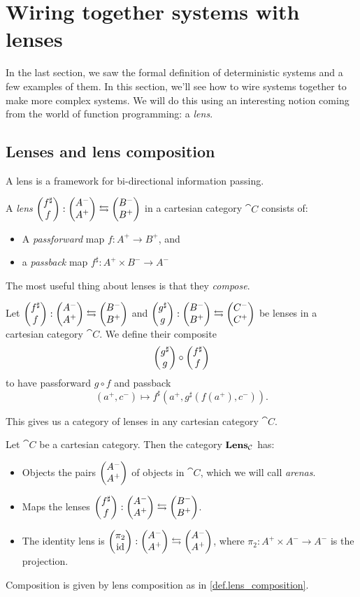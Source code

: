 \documentclass[DynamicalBook]{subfiles}
\begin{document}
\section{Wiring together systems with lenses}

In the last section, we saw the formal definition of deterministic systems and a
few examples of them. In this section, we'll see how to wire systems together to
make more complex systems. We will do this using an interesting notion coming
from the world of function programming: a \emph{lens}.

\subsection{Lenses and lens composition}\label{sec.lens_discrete}

A lens is a framework for bi-directional information passing.

\begin{definition}\label{def.lens}
  A \emph{lens} $\begin{pmatrix}{f^{\sharp}} \\ {f} \end{pmatrix} : \begin{pmatrix}{A^-} \\ {A^+} \end{pmatrix} \leftrightarrows
  \begin{pmatrix}{B^-} \\ {B^+} \end{pmatrix}$ in a cartesian category $\cat{C}$ consists of:
  \begin{itemize}
  \item A \emph{passforward} map $f : A^+ \to B^+$, and
    \item a \emph{passback} map $f^{\sharp} : A^+ \times B^- \to A^-$
  \end{itemize}
\end{definition}

The most useful thing about lenses is that they \emph{compose}.
\begin{definition}\label{def.lens_composition}
  Let $\begin{pmatrix}{f^{\sharp}} \\ {f} \end{pmatrix} : \begin{pmatrix}{A^-} \\ {A^+} \end{pmatrix} \leftrightarrows \begin{pmatrix}{B^-} \\ {B^+} \end{pmatrix}$ and
  $\begin{pmatrix}{g^{\sharp}} \\ {g} \end{pmatrix} : \begin{pmatrix}{B^-} \\ {B^+} \end{pmatrix} \leftrightarrows \begin{pmatrix}{C^-} \\ {C^+} \end{pmatrix}$ be lenses in
  a cartesian category $\cat{C}$. We define their composite
  $$\begin{pmatrix}{g^{\sharp}} \\ {g} \end{pmatrix} \circ \begin{pmatrix}{f^{\sharp}} \\ {f} \end{pmatrix}$$
  to have passforward $g \circ f$ and passback
  $$(a^+, c^-) \mapsto f^{\sharp}(a^+, g^{\sharp}(f(a^+), c^-)).$$

\end{definition}

This gives us a category of lenses in any cartesian category $\cat{C}$.
\begin{definition}\label{def.lens_category}
Let $\cat{C}$ be a cartesian category. Then the category $\textbf{Lens}_{\mathcal{C}}$
has:
\begin{itemize}
\item Objects the pairs $\begin{pmatrix}{A^-} \\ {A^+} \end{pmatrix}$ of objects in $\cat{C}$, which we will
  call \emph{arenas}.
\item Maps the lenses $\begin{pmatrix}{f^{\sharp}} \\ {f} \end{pmatrix} : \begin{pmatrix}{A^-} \\ {A^+} \end{pmatrix} \leftrightarrows \begin{pmatrix}{B^-} \\ {B^+} \end{pmatrix}$.
\item The identity lens is $\begin{pmatrix}{\pi_2} \\ {\mathrm{id}} \end{pmatrix} : \begin{pmatrix}{A^-} \\ {A^+} \end{pmatrix} \leftrightarrows
  \begin{pmatrix}{A^-} \\ {A^+} \end{pmatrix}$, where $\pi_2 : A^+ \times A^- \to A^-$ is the projection.
\end{itemize}
\item Composition is given by lens composition as in \cref{def.lens_composition}.
\end{definition}
\end{document}
